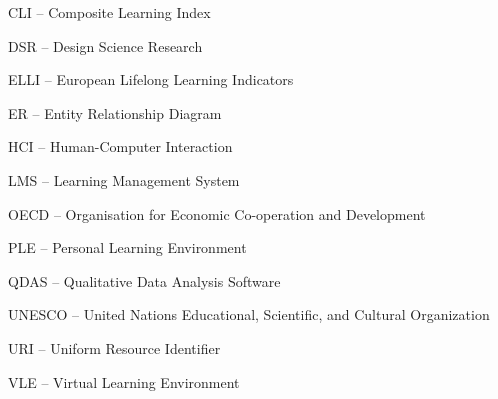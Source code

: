 CLI -- Composite Learning Index

DSR -- Design Science Research

ELLI -- European Lifelong Learning Indicators

ER -- Entity Relationship Diagram

HCI -- Human-Computer Interaction

LMS -- Learning Management System

OECD -- Organisation for Economic Co-operation and Development

PLE -- Personal Learning Environment

QDAS -- Qualitative Data Analysis Software

UNESCO -- United Nations Educational, Scientific, and Cultural Organization

URI -- Uniform Resource Identifier

VLE -- Virtual Learning Environment




